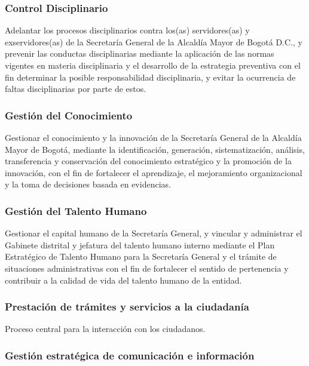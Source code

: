 \documentclass[
	a4paper, %
	12pt, %
]{include/CSSullivanBusinessReport}
\begin{document}
\subsubsection{Control Disciplinario}\label{sec:control-disciplinario}

Adelantar los procesos disciplinarios contra los(as) servidores(as) y
exservidores(as) de la Secretaría General de la Alcaldía Mayor de Bogotá
D.C., y prevenir las conductas disciplinarias mediante la aplicación de
las normas vigentes en materia disciplinaria y el desarrollo de la
estrategia preventiva con el fin determinar la posible responsabilidad
disciplinaria, y evitar la ocurrencia de faltas disciplinarias por parte
de estos.

\subsubsection{Gestión del
Conocimiento}\label{sec:gestiuxf3n-del-conocimiento}

Gestionar el conocimiento y la innovación de la Secretaría General de la
Alcaldía Mayor de Bogotá, mediante la identificación, generación,
sistematización, análisis, transferencia y conservación del conocimiento
estratégico y la promoción de la innovación, con el fin de fortalecer el
aprendizaje, el mejoramiento organizacional y la toma de decisiones
basada en evidencias.

\subsubsection{Gestión del Talento
Humano}\label{sec:gestiuxf3n-del-talento-humano}

Gestionar el capital humano de la Secretaría General, y vincular y
administrar el Gabinete distrital y jefatura del talento humano interno
mediante el Plan Estratégico de Talento Humano para la Secretaría
General y el trámite de situaciones administrativas con el fin de
fortalecer el sentido de pertenencia y contribuir a la calidad de vida
del talento humano de la entidad.

\subsubsection{Prestación de trámites y servicios a la
ciudadanía}\label{sec:prestaciuxf3n-de-truxe1mites-y-servicios-a-la-ciudadanuxeda}

Proceso central para la interacción con los ciudadanos.

\subsubsection{Gestión estratégica de comunicación e
información}\label{sec:gestiuxf3n-estratuxe9gica-de-comunicaciuxf3n-e-informaciuxf3n}
\end{document}
